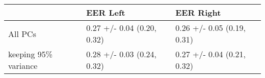\begin{tabular}{lll}
\toprule
{} &                    EER Left &                   EER Right \\
\midrule
All PCs              &  0.27 +/- 0.04 (0.20, 0.32) &  0.26 +/- 0.05 (0.19, 0.31) \\
keeping 95\% variance &  0.28 +/- 0.03 (0.24, 0.32) &  0.27 +/- 0.04 (0.21, 0.32) \\
\bottomrule
\end{tabular}
